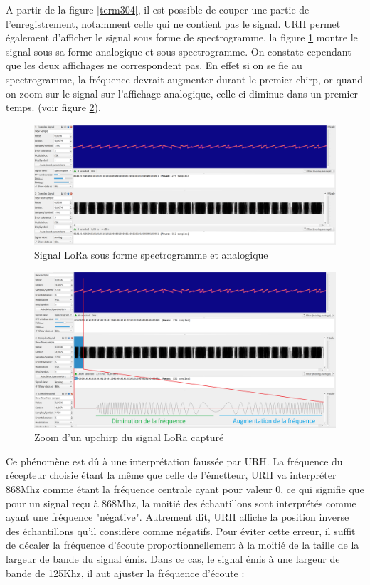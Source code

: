 A partir de la figure \ref{term304}, il est possible de couper une partie de l'enregistrement, notamment celle qui ne contient pas le signal. URH permet également d'afficher le signal sous forme de spectrogramme, la figure \ref{term306} montre le signal sous sa forme analogique et sous spectrogramme. On constate cependant que les deux affichages ne correspondent pas. En effet si on se fie au spectrogramme, la fréquence devrait augmenter durant le premier chirp, or quand on zoom sur le signal sur l'affichage analogique, celle ci diminue dans un premier temps. (voir figure \ref{term307}).

\newpage

\begin{figure}[h]
\centering

\includegraphics[scale=0.11]{images/urh4.png}
\caption{Signal LoRa sous forme spectrogramme et analogique}\label{term306}
\end{figure}

\begin{figure}[h]
\centering

\includegraphics[scale=0.18]{images/urh5.png}
\caption{Zoom d'un upchirp du signal LoRa capturé}\label{term307}
\end{figure}

Ce phénomène est dû à une interprétation faussée par URH. La fréquence du récepteur choisie étant la même que celle de l'émetteur, URH va interpréter 868Mhz comme étant la fréquence centrale ayant pour valeur 0, ce qui signifie que pour un signal reçu à 868Mhz, la moitié des échantillons sont interprétés comme ayant une fréquence "négative". Autrement dit, URH affiche la position inverse des échantillons qu'il considère comme négatifs. Pour éviter cette erreur, il suffit de décaler la fréquence d'écoute proportionnellement à la moitié de la taille de la largeur de bande du signal émis. Dans ce cas, le signal émis à une largeur de bande de 125Khz, il aut ajuster la fréquence d'écoute :

